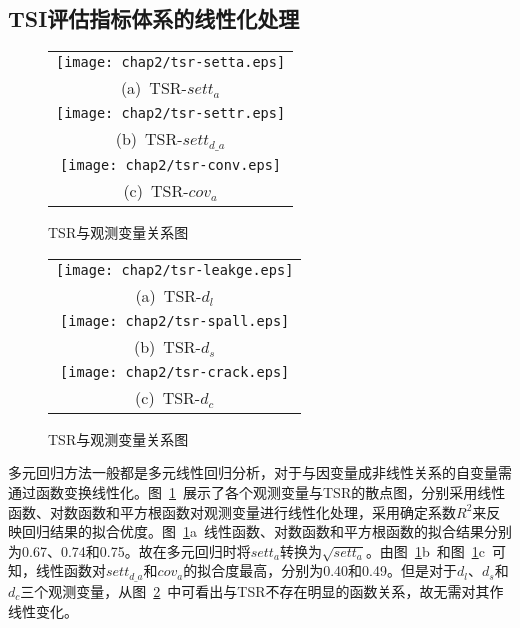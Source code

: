 \subsection{TSI评估指标体系的线性化处理}

\begin{figure}[htbp!] 
    \centering 
    \begin{tabular}{c} 
        \texttt{[image: chap2/tsr-setta.eps]} \\ 
        (a)~TSR-${sett}_{a}$ \\
        \texttt{[image: chap2/tsr-settr.eps]} \\ 
        (b)~TSR-$set{{t}_{d\_a}}$ \\
        \texttt{[image: chap2/tsr-conv.eps]} \\ 
        (c)~TSR-${cov}_{a}$ \\
    \end{tabular}
    \caption{TSR与观测变量关系图} 
    \label{fig:TSR与观测变量关系图} 
\end{figure}

\begin{figure}[htbp!] 
    \centering 
    \begin{tabular}{c} 
        \texttt{[image: chap2/tsr-leakge.eps]} \\ 
        (a)~TSR-${d}_{l}$ \\
        \texttt{[image: chap2/tsr-spall.eps]} \\ 
        (b)~TSR-$d_s$ \\
        \texttt{[image: chap2/tsr-crack.eps]} \\ 
        (c)~TSR-$d_c$ \\
    \end{tabular}
    \caption{TSR与观测变量关系图} 
    \label{fig:TSR与观测变量关系图2} 
\end{figure}

多元回归方法一般都是多元线性回归分析，对于与因变量成非线性关系的自变量需通过函数变换线性化。图~\ref{fig:TSR与观测变量关系图}~展示了各个观测变量与TSR的散点图，分别采用线性函数、对数函数和平方根函数对观测变量进行线性化处理，采用确定系数$R^2$来反映回归结果的拟合优度。图~\ref{fig:TSR与观测变量关系图}a~线性函数、对数函数和平方根函数的拟合结果分别为0.67、0.74和0.75。故在多元回归时将${sett}_{a}$转换为$\sqrt{sett_a}$。由图~\ref{fig:TSR与观测变量关系图}b~和图~\ref{fig:TSR与观测变量关系图}c~可知，线性函数对$set{{t}_{d\_a}}$和${cov}_{a}$的拟合度最高，分别为0.40和0.49。但是对于${d}_{l}$、$d_s$和$d_c$三个观测变量，从图~\ref{fig:TSR与观测变量关系图2}~中可看出与TSR不存在明显的函数关系，故无需对其作线性变化。

